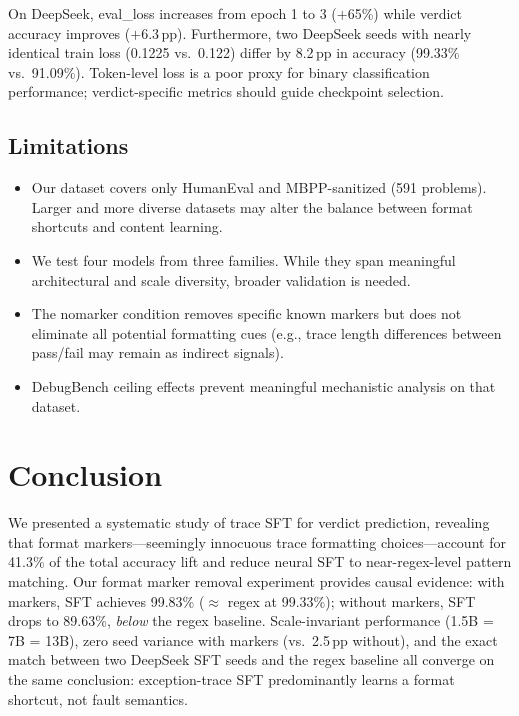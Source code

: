 \documentclass[11pt,a4paper]{article}
\newcommand{\pp}{\,\text{pp}}
\begin{document}
On DeepSeek, eval\_loss increases from epoch 1 to 3 ($+$65\%) while verdict accuracy improves ($+$6.3$\pp$).
Furthermore, two DeepSeek seeds with nearly identical train loss (0.1225 vs.\ 0.122) differ by 8.2$\pp$ in accuracy (99.33\% vs.\ 91.09\%).
Token-level loss is a poor proxy for binary classification performance; verdict-specific metrics should guide checkpoint selection.

\subsection{Limitations}

\begin{itemize}
    \item Our dataset covers only HumanEval and MBPP-sanitized (591 problems). Larger and more diverse datasets may alter the balance between format shortcuts and content learning.
    \item We test four models from three families. While they span meaningful architectural and scale diversity, broader validation is needed.
    \item The nomarker condition removes specific known markers but does not eliminate all potential formatting cues (e.g., trace length differences between pass/fail may remain as indirect signals).
    \item DebugBench ceiling effects prevent meaningful mechanistic analysis on that dataset.
\end{itemize}

\section{Conclusion}
\label{sec:conclusion}

We presented a systematic study of trace SFT for verdict prediction, revealing that format markers---seemingly innocuous trace formatting choices---account for 41.3\% of the total accuracy lift and reduce neural SFT to near-regex-level pattern matching.
Our format marker removal experiment provides causal evidence: with markers, SFT achieves 99.83\% ($\approx$ regex at 99.33\%); without markers, SFT drops to 89.63\%, \emph{below} the regex baseline.
Scale-invariant performance (1.5B = 7B = 13B), zero seed variance with markers (vs.\ 2.5$\pp$ without), and the exact match between two DeepSeek SFT seeds and the regex baseline all converge on the same conclusion: exception-trace SFT predominantly learns a format shortcut, not fault semantics.
\end{document}
